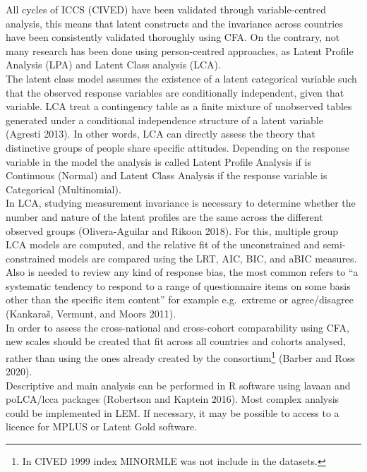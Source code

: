 \documentclass[
  11pt,
]{article}
\begin{document}
All cycles of ICCS (CIVED) have been validated through variable-centred
analysis, this means that latent constructs and the invariance across
countries have been consistently validated thoroughly using CFA. On the
contrary, not many research has been done using person-centred
approaches, as Latent Profile Analysis (LPA) and Latent Class analysis
(LCA).\\
\newline  The latent class model assumes the existence of a latent
categorical variable such that the observed response variables are
conditionally independent, given that variable. LCA treat a contingency
table as a finite mixture of unobserved tables generated under a
conditional independence structure of a latent variable (Agresti 2013).
In other words, LCA can directly assess the theory that distinctive
groups of people share specific attitudes. Depending on the response
variable in the model the analysis is called Latent Profile Analysis if
is Continuous (Normal) and Latent Class Analysis if the response
variable is Categorical (Multinomial).\\
\newline  In LCA, studying measurement invariance is necessary to
determine whether the number and nature of the latent profiles are the
same across the different observed groups (Olivera-Aguilar and Rikoon
2018). For this, multiple group LCA models are computed, and the
relative fit of the unconstrained and semi-constrained models are
compared using the LRT, AIC, BIC, and aBIC measures. Also is needed to
review any kind of response bias, the most common refers to ``a
systematic tendency to respond to a range of questionnaire items on some
basis other than the specific item content'' for example e.g.~extreme or
agree/disagree (Kankaraš, Vermunt, and Moors 2011).\\
\newline  In order to assess the cross-national and cross-cohort
comparability using CFA, new scales should be created that fit across
all countries and cohorts analysed, rather than using the ones already
created by the consortium\footnote{In CIVED 1999 index MINORMLE was not
  include in the datasets.} (Barber and Ross 2020).\\
\newline  Descriptive and main analysis can be performed in R software
using lavaan and poLCA/lcca packages (Robertson and Kaptein 2016). Most
complex analysis could be implemented in LEM. If necessary, it may be
possible to access to a licence for MPLUS or Latent Gold software.
\end{document}
